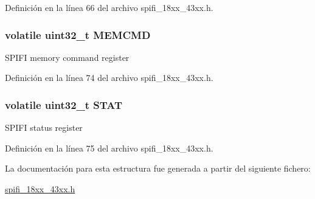 Definición en la línea 66 del archivo spifi\+\_\+18xx\+\_\+43xx.\+h.

\subsubsection[{\texorpdfstring{M\+E\+M\+C\+MD}{MEMCMD}}]{\setlength{\rightskip}{0pt plus 5cm}volatile uint32\+\_\+t M\+E\+M\+C\+MD}\hypertarget{struct_l_p_c___s_p_i_f_i___c_h_i_p_h_w_a3be351d2b90c79bc0e1a327bb35b8d6c}{}\label{struct_l_p_c___s_p_i_f_i___c_h_i_p_h_w_a3be351d2b90c79bc0e1a327bb35b8d6c}
S\+P\+I\+FI memory command register 

Definición en la línea 74 del archivo spifi\+\_\+18xx\+\_\+43xx.\+h.

\subsubsection[{\texorpdfstring{S\+T\+AT}{STAT}}]{\setlength{\rightskip}{0pt plus 5cm}volatile uint32\+\_\+t S\+T\+AT}\hypertarget{struct_l_p_c___s_p_i_f_i___c_h_i_p_h_w_a600a8724a82efe4028e2b4fd3e8e61fe}{}\label{struct_l_p_c___s_p_i_f_i___c_h_i_p_h_w_a600a8724a82efe4028e2b4fd3e8e61fe}
S\+P\+I\+FI status register 

Definición en la línea 75 del archivo spifi\+\_\+18xx\+\_\+43xx.\+h.



La documentación para esta estructura fue generada a partir del siguiente fichero\+:\begin{DoxyCompactItemize}
\item 
\hyperlink{spifi__18xx__43xx_8h}{spifi\+\_\+18xx\+\_\+43xx.\+h}\end{DoxyCompactItemize}
